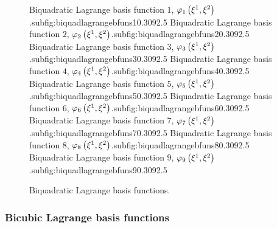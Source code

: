 \begin{figure}[hbtp]
   \centering
     {Biquadratic Lagrange basis function $1$, $   \varphi_{1} \left( \xi^{1},\xi^{2} \right)  $.}{subfig:biquadlagrangebfuns1}{0.30\linewidth}{9}{2.5}{}
   \hfil
     {Biquadratic Lagrange basis function $2$, $   \varphi_{2} \left( \xi^{1},\xi^{2} \right)  $.}{subfig:biquadlagrangebfuns2}{0.30\linewidth}{9}{2.5}{}
   \hfil
     {Biquadratic Lagrange basis function $3$, $   \varphi_{3} \left( \xi^{1},\xi^{2} \right)  $.}{subfig:biquadlagrangebfuns3}{0.30\linewidth}{9}{2.5}{}
     {Biquadratic Lagrange basis function $4$, $   \varphi_{4} \left( \xi^{1},\xi^{2} \right)  $.}{subfig:biquadlagrangebfuns4}{0.30\linewidth}{9}{2.5}{}
   \hfil
     {Biquadratic Lagrange basis function $5$, $   \varphi_{5} \left( \xi^{1},\xi^{2} \right)  $.}{subfig:biquadlagrangebfuns5}{0.30\linewidth}{9}{2.5}{}
   \hfil
     {Biquadratic Lagrange basis function $6$, $   \varphi_{6} \left( \xi^{1},\xi^{2} \right)  $.}{subfig:biquadlagrangebfuns6}{0.30\linewidth}{9}{2.5}{}
     {Biquadratic Lagrange basis function $7$, $   \varphi_{7} \left( \xi^{1},\xi^{2} \right)  $.}{subfig:biquadlagrangebfuns7}{0.30\linewidth}{9}{2.5}{}
   \hfil
     {Biquadratic Lagrange basis function $8$, $   \varphi_{8} \left( \xi^{1},\xi^{2} \right)  $.}{subfig:biquadlagrangebfuns8}{0.30\linewidth}{9}{2.5}{}
   \hfil
     {Biquadratic Lagrange basis function $9$, $   \varphi_{9} \left( \xi^{1},\xi^{2} \right)  $.}{subfig:biquadlagrangebfuns9}{0.30\linewidth}{9}{2.5}{}
   \caption[Biquadratic Lagrange basis functions.]{Biquadratic Lagrange basis functions.}
   \label{fig:biquadlagrangebfuns}
\end{figure}


\subsubsection{Bicubic Lagrange basis functions}


